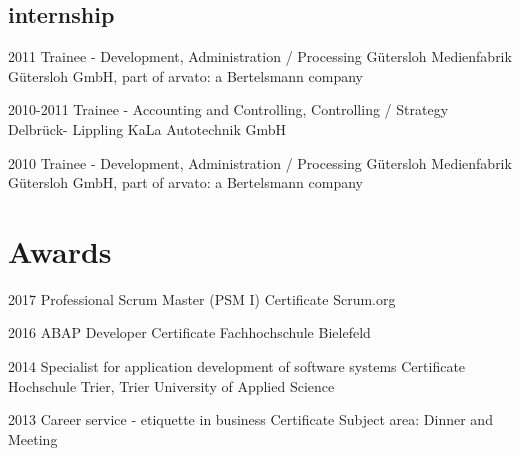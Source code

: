 \documentclass[]{friggeri-cv} %
\begin{document}
\subsection{internship}

\begin{entrylist}
	
	
	\entry
	{2011}
	{Trainee - Development, Administration / Processing}
	{G\"{u}tersloh}
	{Medienfabrik G\"{u}tersloh GmbH, part of arvato: a Bertelsmann company}
	
	\entry
	{2010-2011}
	{Trainee - Accounting and Controlling, Controlling / Strategy}
	{Delbr\"{u}ck- Lippling}
	{KaLa Autotechnik GmbH}
	
	
	\entry
	{2010}
	{Trainee - Development, Administration / Processing}
	{G\"{u}tersloh}
	{Medienfabrik G\"{u}tersloh GmbH, part of arvato: a Bertelsmann company}


\end{entrylist}

\pagebreak

\section{Awards}

\begin{entrylist}

	
	\entry
	{2017}
	{Professional Scrum Master (PSM I)}
	{Certificate}
	{Scrum.org}
	
	
	\entry
	{2016}
	{ABAP Developer}
	{Certificate}
	{Fachhochschule Bielefeld}
	
	
	\entry
	{2014}
	{Specialist for application development of software systems}
	{Certificate}
	{Hochschule Trier, Trier University of Applied Science}
	
	
	\entry
	{2013}
	{Career service - etiquette in business}
	{Certificate}
	{Subject area: Dinner and Meeting}
	

\end{entrylist}
\end{document}
